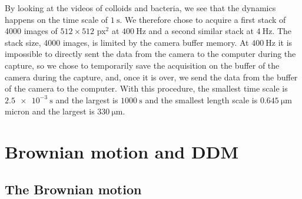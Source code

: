 \documentclass[%
 aip,
 jmp,%
 amsmath,amssymb,
reprint,%
]{revtex4-1}
\begin{document}
By looking at the videos of colloids and bacteria, we see that the dynamics happens on the time scale of $\SI{1}{\second}$. We therefore chose to acquire a first stack of 4000 images of  $512 \times 512$ px$^2$ at $\SI{400}{\hertz}$ and a second similar stack at $\SI{4}{\hertz}$. The stack size, 4000 images, is limited by the camera buffer memory. At $\SI{400}{\hertz}$ it is impossible to directly sent the data from the camera to the computer during the capture, so we chose to temporarily save the acquisition on the buffer of the camera during the capture, and, once it is over, we send the data from the buffer of the camera to the computer. With this procedure, the smallest time scale is $\SI{2.5e-3}{\second}$ and the largest is $\SI{1000}{\second}$ and the smallest length scale is $\SI{0.645}{\micro\meter}$ micron and the largest is $\SI{330}{\micro\meter}$. 



\section{Brownian motion and DDM}
\label{sec:BrownSection}

\subsection{The Brownian motion}
\end{document}
